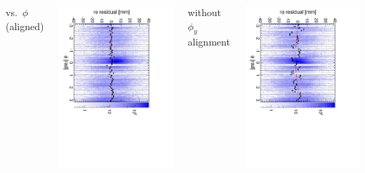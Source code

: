 \documentclass[compress]{beamer}
\begin{document}
\begin{frame}
\begin{columns}
\centering vs.\ $\phi$ (aligned)

\includegraphics[height=\linewidth, angle=90]{diskiter02_p2to1inner.pdf}

\centering without $\phi_y$ alignment

\includegraphics[height=\linewidth, angle=90]{diskiter02_phiyzero_p2to1inner.pdf}
\end{columns}
\end{frame}
\end{document}
